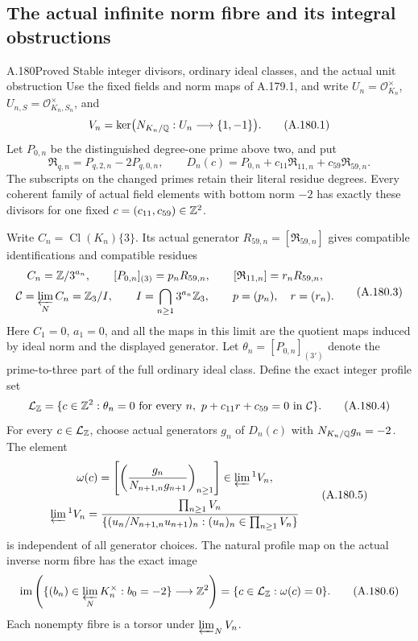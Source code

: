 \subsection{The actual infinite norm fibre and its integral obstructions}

\begin{statement}{A.180}{Proved}
{Stable integer divisors, ordinary ideal classes, and the actual unit obstruction}
Use the fixed fields and norm maps of A.179.1, and write
\(U_n=\mathcal O_{K_n}^{\times}\),
\(U_{n,S}=\mathcal O_{K_n,S_n}^{\times}\), and
\[
 V_n=\ker\bigl(N_{K_n/\mathbb Q}:U_n\longrightarrow\{1,-1\}\bigr).
\tag{A.180.1}
\]
Let \(P_{0,n}\) be the distinguished degree-one prime above two,
and put
\[
 \mathfrak R_{q,n}=P_{q,2,n}-2P_{q,0,n},\qquad
 D_n(c)=P_{0,n}+c_{11}\mathfrak R_{11,n}
                         +c_{59}\mathfrak R_{59,n}.
\tag{A.180.2}
\]
The subscripts on the changed primes retain their literal residue
degrees.  Every coherent family of actual field elements with bottom
norm \(-2\) has exactly these divisors for one fixed
\(c=(c_{11},c_{59})\in\mathbb Z^2\).

Write \(C_n=\operatorname{Cl}(K_n)\{3\}\).  Its actual generator
\(R_{59,n}=[\mathfrak R_{59,n}]\) gives compatible identifications
and compatible residues
\[
 \begin{gathered}
 C_n=\mathbb Z/3^{a_n},\qquad
 [P_{0,n}]_{(3)}=p_nR_{59,n},\qquad
 [\mathfrak R_{11,n}]=r_nR_{59,n},\\
 \mathcal C=\varprojlim_N C_n=\mathbb Z_3/I,
 \qquad I=\bigcap_{n\ge1}3^{a_n}\mathbb Z_3,
 \qquad p=(p_n),\quad r=(r_n).
 \end{gathered}
\tag{A.180.3}
\]
Here \(C_1=0\), \(a_1=0\), and all the maps in this limit are
the quotient maps induced by ideal norm and the displayed generator.
Let \(\theta_n=[P_{0,n}]_{(3')}\) denote the prime-to-three part
of the full ordinary ideal class.  Define the exact integer profile set
\[
 \mathcal L_{\mathbb Z}=
 \{c\in\mathbb Z^2:\theta_n=0\text{ for every }n,
                   \ p+c_{11}r+c_{59}=0\text{ in }\mathcal C\}.
\tag{A.180.4}
\]
For every \(c\in\mathcal L_{\mathbb Z}\), choose actual generators
\(g_n\) of \(D_n(c)\) with \(N_{K_n/\mathbb Q}g_n=-2\).
The element
\[
 \begin{gathered}
 \omega(c)=\left[\left(\frac{g_n}{N_{n+1,n}g_{n+1}}\right)_{n\ge1}\right]
                      \in\varprojlim{}^{1} V_n,\\
 \varprojlim{}^{1}V_n=
 \frac{\prod_{n\ge1}V_n}
 {\{(u_n/N_{n+1,n}u_{n+1})_n:(u_n)_n\in\prod_{n\ge1}V_n\}}
 \end{gathered}
\tag{A.180.5}
\]
is independent of all generator choices.  The natural profile map on
the actual inverse norm fibre has the exact image
\[
 \operatorname{im}\left(
 \{(b_n)\in\varprojlim_N K_n^{\times}:b_0=-2\}
                  \longrightarrow\mathbb Z^2\right)
     =\{c\in\mathcal L_{\mathbb Z}:\omega(c)=0\}.
\tag{A.180.6}
\]
Each nonempty fibre is a torsor under \(\varprojlim_N V_n\).


\end{statement}
